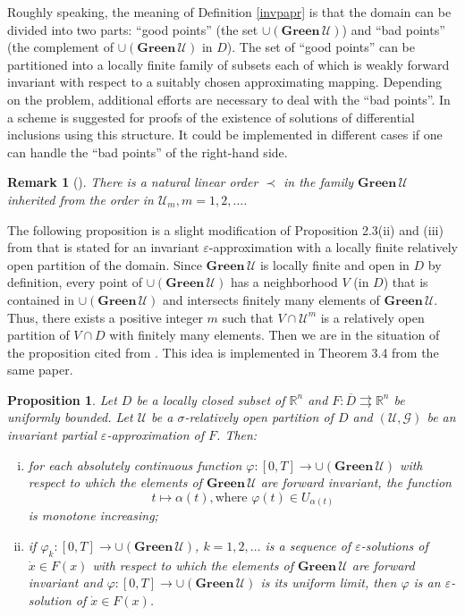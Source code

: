 \documentclass[a4paper]{article}
\newtheorem{prop}[thm]{Proposition}
\newtheorem{rem}[thm]{Remark}
\begin{document}
Roughly speaking, the meaning of Definition \ref{invpapr} is that the domain can be divided into two parts: ``good points'' (the set $\cup (\mathbf{Green} \, \mathcal{U})$) and ``bad points'' (the complement of $\cup (\mathbf{Green} \, \mathcal{U})$ in $D$). The set of ``good points'' can be partitioned into a locally finite family of subsets each of which is weakly forward invariant with respect to a suitably chosen approximating mapping. Depending on the problem, additional efforts are necessary to deal with the ``bad points''.  In \cite{KR} a scheme is suggested for proofs of the existence of solutions of differential inclusions using this structure. It could be implemented in different cases if one can handle the ``bad points'' of the right-hand side.

\begin{rem}[\cite{KR}]
    There is a natural linear order $\prec$ in the family $\mathbf{Green}\,\mathcal{U}$ inherited from the order in $\mathcal{U}_m, m = 1,2,\dots$.
\end{rem}

The following proposition is a slight modification of Proposition 2.3(ii) and (iii) from \cite{KR} that is stated for an invariant $\varepsilon$-approximation with a locally finite relatively open partition of the domain. Since $\mathbf{Green}\,\mathcal{U}$ is locally finite and open in $D$ by definition, every point of $\cup\left(\mathbf{Green}\,\mathcal{U}\right)$ has a neighborhood $V$ (in $D$) that is contained in $\cup\left(\mathbf{Green}\,\mathcal{U}\right)$ and intersects finitely many elements of $\mathbf{Green}\,\mathcal{U}$. Thus, there exists a positive integer $m$ such that $V \cap \mathcal{U}^m$ is a relatively open partition of $V \cap D$ with finitely many elements. Then we are in the situation of the proposition cited from \cite{KR}. This idea is implemented in Theorem 3.4 from the same paper.

\begin{prop}\label{ulimit-sol}
    Let $D$ be a locally closed subset of $\mathbb{R}^n$ and $F: \overline{D} \rightrightarrows \mathbb{R}^n$ be uniformly bounded. Let $\mathcal{U}$ be a $\sigma$-relatively open partition of $D$ and $(\mathcal{U},\mathcal{G})$ be an invariant partial $\varepsilon$-approximation of $F$. Then:
    \begin{enumerate}[(i)]
        \item for each absolutely continuous function $\varphi: [0,T] \to \cup\left(\mathbf{Green}\,\mathcal{U}\right)$ with respect to which the elements of $\mathbf{Green}\,\mathcal{U}$ are forward invariant, the function $$t \mapsto \alpha(t), \text{where } \varphi(t) \in U_{\alpha(t)}$$ is monotone increasing;
        \item if $\varphi_k : [0,T] \to \cup\left(\mathbf{Green}\,\mathcal{U}\right)$, $k=1,2,\dots$ is a sequence of $\varepsilon$-solutions of $\dot{x} \in F(x)$ with respect to which the elements of $\mathbf{Green}\,\mathcal{U}$ are forward invariant and $\varphi : [0,T] \to \cup\left(\mathbf{Green}\,\mathcal{U}\right)$ is its uniform limit, then $\varphi$ is an $\varepsilon$-solution of $\dot{x} \in F(x)$.
    \end{enumerate}
\end{prop}
\end{document}
